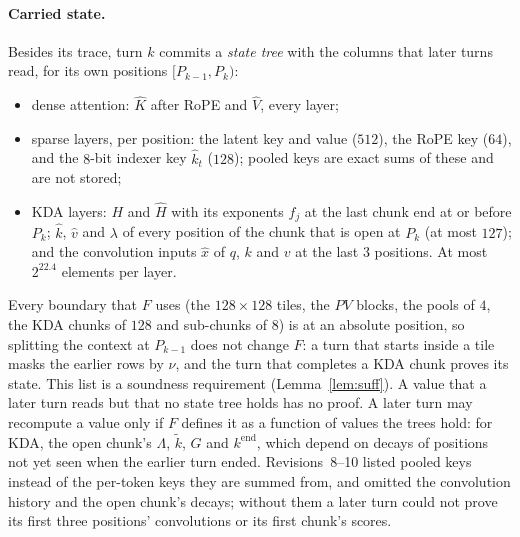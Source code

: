 \documentclass[11pt]{article}
\begin{document}
\paragraph{Carried state.}
Besides its trace, turn \(k\) commits a \emph{state tree} with the columns that later turns read, for its own positions \([P_{k-1}, P_k)\):
\begin{itemize}
\item dense attention: \(\hat K\) after RoPE and \(\hat V\), every layer;
\item sparse layers, per position: the latent key and value (\(512\)), the RoPE key (\(64\)), and the \(8\)-bit indexer key \(\hat k_t\) (\(128\)); pooled keys are exact sums of these and are not stored;
\item KDA layers: \(H\) and \(\hat H\) with its exponents \(f_j\) at the last chunk end at or before \(P_k\); \(\hat k\), \(\hat v\) and \(\lambda\) of every position of the chunk that is open at \(P_k\) (at most \(127\)); and the convolution inputs \(\hat x\) of \(q\), \(k\) and \(v\) at the last \(3\) positions. At most \(2^{22.4}\) elements per layer.
\end{itemize}
Every boundary that \(F\) uses (the \(128\times128\) tiles, the \(PV\) blocks, the pools of \(4\), the KDA chunks of \(128\) and sub-chunks of \(8\)) is at an absolute position, so splitting the context at \(P_{k-1}\) does not change \(F\): a turn that starts inside a tile masks the earlier rows by \(\nu\), and the turn that completes a KDA chunk proves its state.
This list is a soundness requirement (Lemma~\ref{lem:suff}).
A value that a later turn reads but that no state tree holds has no proof.
A later turn may recompute a value only if \(F\) defines it as a function of values the trees hold: for KDA, the open chunk's \(\Lambda\), \(\tilde k\), \(G\) and \(k^{\mathrm{end}}\), which depend on decays of positions not yet seen when the earlier turn ended.
Revisions~8--10 listed pooled keys instead of the per-token keys they are summed from, and omitted the convolution history and the open chunk's decays; without them a later turn could not prove its first three positions' convolutions or its first chunk's scores.
\end{document}
